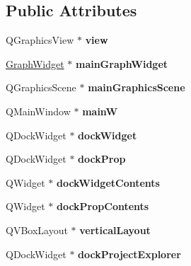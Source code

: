 \subsection*{Public Attributes}
\begin{DoxyCompactItemize}
\item 
\mbox{\label{class_main_window_a6e33bc418ea3e6d93b3021933bfa3baa}} 
Q\+Graphics\+View $\ast$ {\bfseries view}
\item 
\mbox{\label{class_main_window_a39be8da947f51a2e9615e27416dba711}} 
\hyperlink{class_graph_widget}{Graph\+Widget} $\ast$ {\bfseries main\+Graph\+Widget}
\item 
\mbox{\label{class_main_window_a1d436cfe16ee1f033386f00680312c3b}} 
Q\+Graphics\+Scene $\ast$ {\bfseries main\+Graphics\+Scene}
\item 
\mbox{\label{class_main_window_a412122fa4ec4c613e70e44e2b0b0f1ba}} 
Q\+Main\+Window $\ast$ {\bfseries mainW}
\item 
\mbox{\label{class_main_window_add026ab91c532052d149541db295b140}} 
Q\+Dock\+Widget $\ast$ {\bfseries dock\+Widget}
\item 
\mbox{\label{class_main_window_a00749e307b2198ac489f420bb3bf431d}} 
Q\+Dock\+Widget $\ast$ {\bfseries dock\+Prop}
\item 
\mbox{\label{class_main_window_a535f65cd23e3bc6a0d4b582671111cd5}} 
Q\+Widget $\ast$ {\bfseries dock\+Widget\+Contents}
\item 
\mbox{\label{class_main_window_a4d4f24b174cb3efa17fbb3d60a4e2987}} 
Q\+Widget $\ast$ {\bfseries dock\+Prop\+Contents}
\item 
\mbox{\label{class_main_window_a27112d7db9fb5d46fe348f82ec04575c}} 
Q\+V\+Box\+Layout $\ast$ {\bfseries vertical\+Layout}
\item 
\mbox{\label{class_main_window_a7e60fd12530e29d97d3c305a55b422a1}} 
Q\+Dock\+Widget $\ast$ {\bfseries dock\+Project\+Explorer}
\item 

\end{DoxyCompactItemize}

